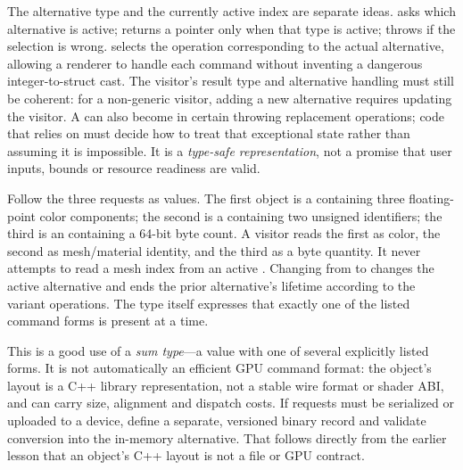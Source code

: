 The alternative type and the currently active index are separate ideas.  asks which alternative is active;  returns a pointer only when that type is active;  throws  if the selection is wrong.  selects the operation corresponding to the actual alternative, allowing a renderer to handle each command without inventing a dangerous integer-to-struct cast. The visitor's result type and alternative handling must still be coherent: for a non-generic visitor, adding a new alternative requires updating the visitor. A  can also become  in certain throwing replacement operations; code that relies on  must decide how to treat that exceptional state rather than assuming it is impossible. It is a \emph{type-safe representation}, not a promise that user inputs, bounds or resource readiness are valid.

Follow the three requests as values. The first object is a  containing three floating-point color components; the second is a  containing two unsigned identifiers; the third is an  containing a 64-bit byte count. A visitor reads the first as color, the second as mesh/material identity, and the third as a byte quantity. It never attempts to read a mesh index from an active . Changing from  to  changes the active alternative and ends the prior alternative's lifetime according to the variant operations. The type itself expresses that exactly one of the listed command forms is present at a time.

This is a good use of a \emph{sum type}---a value with one of several explicitly listed forms. It is not automatically an efficient GPU command format: the object's layout is a C++ library representation, not a stable wire format or shader ABI, and  can carry size, alignment and dispatch costs. If requests must be serialized or uploaded to a device, define a separate, versioned binary record and validate conversion into the in-memory alternative. That follows directly from the earlier lesson that an object's C++ layout is not a file or GPU contract.

